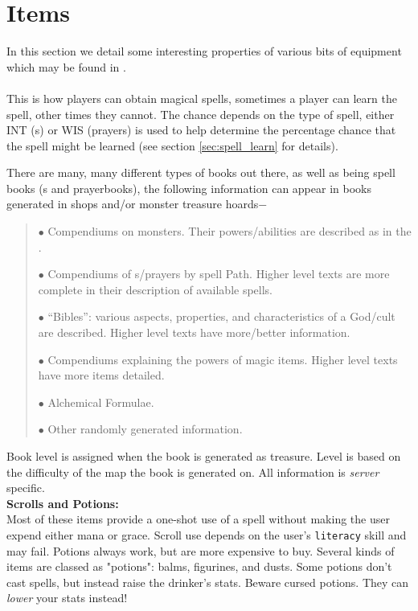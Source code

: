 \section{Items}
\label{sec:items}

In this section we detail some interesting properties of various
bits of equipment which may be found in \cf . \\

 \\
This is how players can obtain magical spells, sometimes a player can
learn the spell, other times they cannot. The chance depends on the type
of spell, either INT (\incantation s) or WIS (prayers) is used to help
determine the percentage chance that the spell might be learned (see section
\ref{sec:spell_learn} for details).

There are many, many different types of books out there,
as well as being spell books (\wizbook s and prayerbooks), the
following information can
appear in books generated in shops and/or monster treasure hoards$-$
\begin{quote}
        $\bullet$ Compendiums on monsters. Their powers/abilities are
            described as in the \spoiler .

        $\bullet$ Compendiums of \incantation s/prayers by spell Path. Higher
            level texts are more complete in their description of
            available spells.

        $\bullet$ ``Bibles'': various aspects, properties, and characteristics
            of a God/cult are described. Higher level texts
            have more/better information.

        $\bullet$ Compendiums explaining the powers of magic items. Higher
            level texts have more items detailed.

        $\bullet$ Alchemical Formulae.

        $\bullet$ Other randomly generated information.
\end{quote}
Book level is assigned when the book is generated as treasure.
Level is based on the difficulty of the map the book is
generated on. All information is {\em server} specific. \\

{\bf Scrolls and Potions:}
\\

	Most of these items provide a one-shot use of a spell without
	making the user expend either mana or grace. Scroll use
	depends on the user's {\tt literacy} skill and may fail. Potions
	always work, but are more expensive to buy. Several kinds
	of items are classed as "potions": balms, figurines, and
	dusts. Some potions don't cast spells, but instead raise
	the drinker's stats. Beware cursed potions. They can {\em lower}
	your stats instead! \\

